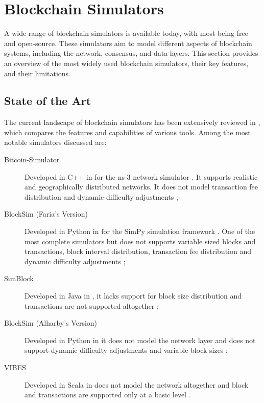 \section{Blockchain Simulators}\label{sec:simulators}

A wide range of blockchain simulators is available today, with most being free
and open-source. These simulators aim to model different aspects of blockchain
systems, including the network, consensus, and data layers. This section
provides an overview of the most widely used blockchain simulators, their key
features, and their limitations.

\subsection{State of the Art}\label{subsec:state-of-the-art}

The current landscape of blockchain simulators has been extensively reviewed in
\cite{simureview}, which compares the features and capabilities of various
tools. Among the most notable simulators discussed are:
\begin{description}
	\item[Bitcoin-Simulator] Developed in C++ in
		\citeyear{bitcoin-simulator} for the ns-3 network simulator
		\cite{ns3}. It supports realistic and geographically
		distributed networks. It does not model transaction fee
		distribution and dynamic difficulty adjustments
		\cite{bitcoin-simulator};
	\item[BlockSim (Faria's Version)] Developed in Python in
		\citeyear{blocksim-faria} for the SimPy simulation framework
		\cite{simpy}. One of the most complete simulators but does not
		supports variable sized blocks and transactions, block interval
		distribution, transaction fee distribution and dynamic
		difficulty adjustments \cite{blocksim-faria};
	\item[SimBlock] Developed in Java in \citeyear{simblock}, it lacks
		support for block size distribution and transactions are not
		supported altogether \cite{simblock};
	\item[BlockSim (Alharby's Version)] Developed in Python in
		\citeyear{blocksim} it does not model the network layer and
		does not support dynamic difficulty adjustments and variable
		block sizes \cite{blocksim};
	\item[VIBES] Developed in Scala in \citeyear{vibes} does not model the
		network altogether and block and transactions are supported
		only at a basic level \cite{vibes}.
\end{description}

